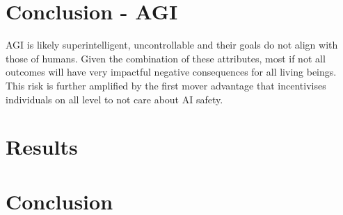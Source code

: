 \documentclass[conference]{IEEEtran}
\begin{document}
\section{Conclusion - AGI}

AGI is likely superintelligent, uncontrollable and their goals do not align with those of humans. Given the combination of these attributes, most if not all outcomes will have very impactful negative consequences for all living beings. This risk is further amplified by the first mover advantage that incentivises individuals on all level to not care about AI safety.

\section{Results}
%


\section{Conclusion}
%


%


\end{document}
